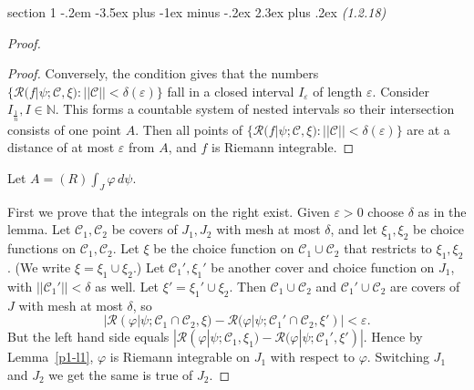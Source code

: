 \documentclass[12pt]{article}
\makeatletter
\theoremstyle{norm}
\newcommand{\N}[0]{\mathbb{N}}
\providecommand{\cal}[1]{\mathcal{#1}}
\renewcommand{\cal}[1]{\mathcal{#1}}
\newcommand{\rc}[1]{\frac{1}{#1}}
\newcommand{\de}[0]{\delta}
\newcommand{\ep}[0]{\varepsilon}
\newcommand{\eph}[0]{\frac{\varepsilon}{2}}
\newcommand{\ph}[0]{\varphi}
\newenvironment{problem}{\@startsection
       {section}
       {1}
       {-.2em}
       {-3.5ex plus -1ex minus -.2ex}
       {2.3ex plus .2ex}
       {\pagebreak[3]%
       \large\bf\noindent{Problem }
       }
       }
       {%
       }
\makeatother
\begin{document}
\begin{problem}{\it (1.2.18)}
\begin{proof}
\begin{proof}
Conversely, the condition gives that the numbers $\{\cal R(f|\psi; \mathcal C, \xi):||\cal C||<\de(\ep)\}$ fall in a closed interval $I_{\ep}$ of length $\ep$. Consider $I_{\rc n}, I\in \N$. This forms a countable system of nested intervals so their intersection consists of one point $A$. Then all points of $\{\cal R(f|\psi; \mathcal C, \xi):||\cal C||<\de(\ep)\}$ are at a distance of at most $\ep$ from $A$, and $f$ is Riemann integrable. 
\end{proof}
Let $A=(R)\int_J \ph\,d\psi$.

First we prove that the integrals on the right exist. 
Given $\ep>0$ choose $\de$ as in the lemma. %
Let $\cal C_1,\cal C_2$ be covers of $J_1,J_2$ with mesh at most $\de$, and let $\xi_1,\xi_2$ be choice functions on $\cal C_1,\cal C_2$.
Let $\xi$ be the choice function on $\cal C_1\cup \cal C_2$ that restricts to $\xi_1,\xi_2$. (We write $\xi=\xi_1\cup \xi_2$.)
Let $\cal C_1', \xi_1'$ be another cover and choice function on $J_1$, with $||\cal C_1'||<\de$ as well. Let $\xi'=\xi_1'\cup \xi_2$. %
Then $\cal C_1\cup \cal C_2$ and $\cal C_1'\cup \cal C_2$ are covers of $J$ with mesh at most $\de$, so
\[
|\mathcal R(\ph|\psi;\cal C_1\cap \cal C_2, \xi)-\mathcal R(\ph|\psi;\cal C_1'\cap \cal C_2, \xi')|<\ep.
\]
But the left hand side equals $|\mathcal R(\ph|\psi;\cal C_1, \xi_1)-\mathcal R(\ph|\psi;\cal C_1', \xi')|$. Hence by Lemma~\ref{p1-l1}, $\ph$ is Riemann integrable on $J_1$ with respect to $\ph$. Switching $J_1$ and $J_2$ we get the same is true of $J_2$.


\end{proof}
\end{problem}
\end{document}
